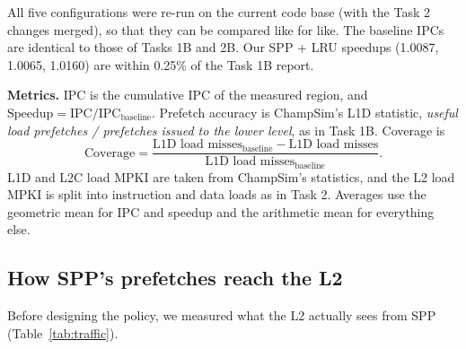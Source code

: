 \documentclass[11pt]{article}
\begin{document}
All five configurations were re-run on the current code base (with the Task 2 changes merged), so
that they can be compared like for like. The baseline IPCs are identical to those of Tasks 1B and
2B. Our SPP + LRU speedups (1.0087, 1.0065, 1.0160) are within 0.25\% of the Task 1B report.

\textbf{Metrics.} IPC is the cumulative IPC of the measured region, and
$\text{Speedup} = \text{IPC} / \text{IPC}_{\text{baseline}}$. Prefetch accuracy is ChampSim's L1D
statistic, \emph{useful load prefetches / prefetches issued to the lower level}, as in Task 1B.
Coverage is
\[
\text{Coverage} = \frac{\text{L1D load misses}_{\text{baseline}} - \text{L1D load misses}}
{\text{L1D load misses}_{\text{baseline}}}.
\]
L1D and L2C load MPKI are taken from ChampSim's
statistics, and the L2 load MPKI is split into instruction and data loads as in Task 2. Averages
use the geometric mean for IPC and speedup and the arithmetic mean for everything else.

\subsection{How SPP's prefetches reach the L2}
\label{sec:traffic}

Before designing the policy, we measured what the L2 actually sees from SPP
(Table~\ref{tab:traffic}).
\end{document}
